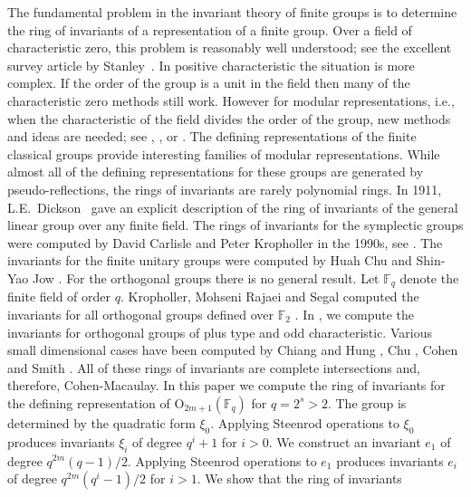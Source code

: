 \documentclass{amsart}
\newcommand{\field}{\mathbb{F}}
\newcommand{\orth}[2]{{{\text{O}_{{#1}}(\field_{#2})}}}
\begin{document}
The fundamental problem in the invariant theory of finite groups is to determine the ring of invariants 
of a representation of a finite group. 
Over a field of characteristic zero, this problem is reasonably well understood; see the excellent survey article by 
Stanley~\cite{stanley-invafinigrouthei:79}.
In positive characteristic the situation is more complex.
If the order of the group is a unit in the field then many of the characteristic zero methods still work. However for modular representations,
i.e., when the characteristic of the field divides the order of the group, new methods and ideas are needed; see 
\cite{benson-polyinvafinigrou:93},
\cite{campbell+wehlau:mit11},
\cite{derksen+kemper-invalggp:08}
or
\cite{neusel+smith-invatheofinigrou:02}.
The defining representations of the finite classical groups provide interesting families of modular representations.
While almost all of the defining representations for these groups are generated by pseudo-reflections, the rings of invariants are rarely polynomial rings. 
In 1911, L.E.~Dickson~\cite{dickson-fundsystinvagene:11} gave an explicit description of the ring of 
invariants of the general linear group over any finite field.   
The rings of invariants for the symplectic groups were computed by David Carlisle and Peter Kropholler in the 1990s, see 
\cite[\S 8.3]{benson-polyinvafinigrou:93}.
The invariants for the finite unitary groups were computed by 
Huah Chu and Shin-Yao Jow \cite{chu+jow-unitary:06}.
For the orthogonal groups there is no general result.  
Let $\field_q$ denote the finite field of order $q$.
Kropholler, Mohseni Rajaei and Segal computed the invariants for
all orthogonal groups defined over $\field_2$ \cite{Kropholler+Rajaei+Segal:05}.
In \cite{campbell+shank+wehlau:24}, we compute the invariants for orthogonal groups of plus type and odd characteristic.
Various small dimensional cases have been computed by
Chiang and Hung \cite{chiang+hung-invorth:93},
Chu \cite{chu-polyinvfourdimorth:01},
Cohen \cite{cohen-ratfuncortho:90}
 and Smith \cite{smith-ringinvorth:99}.
All of these rings of invariants are complete intersections and, therefore, Cohen-Macaulay.
In this paper we  compute the ring of invariants for the defining representation of $\orth{2m+1}{q}$ for $q=2^s>2$. The group is determined by the quadratic form $\xi_0$. Applying Steenrod operations to $\xi_0$ produces invariants
$\xi_i$ of degree $q^i+1$ for $i>0$. 
We construct an invariant $e_1$ of degree $q^{2m}(q-1)/2$.
Applying Steenrod operations to $e_1$ produces invariants $e_i$
of degree $q^{2m}(q^i-1)/2$ for $i>1$. We show  that the ring of invariants
\end{document}
